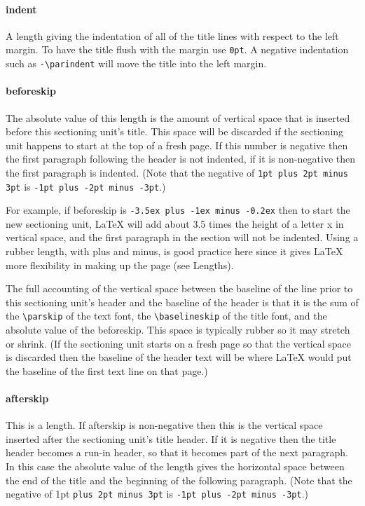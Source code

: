 \paragraph{indent}

A length giving the indentation of all of the title lines with respect to the
left margin. To have the title flush with the margin use \verb|0pt|. A negative
indentation such as \verb|-\parindent| will move the title into the left margin.

\paragraph{beforeskip}

The absolute value of this length is the amount of vertical space that is
inserted before this sectioning unit’s title. This space will be discarded if
the sectioning unit happens to start at the top of a fresh page. If this number
is negative then the first paragraph following the header is not indented, if
it is non-negative then the first paragraph is indented. (Note that the
negative of \verb|1pt plus 2pt minus 3pt| is \verb|-1pt plus -2pt minus -3pt|.)

For example, if beforeskip is \verb|-3.5ex plus -1ex minus -0.2ex| then to start
the new sectioning unit, LaTeX will add about 3.5 times the height of a
letter x in vertical space, and the first paragraph in the section will not
be indented. Using a rubber length, with plus and minus, is good practice
here since it gives LaTeX more flexibility in making up the page (see
Lengths).

The full accounting of the vertical space between the baseline of the line
prior to this sectioning unit’s header and the baseline of the header is
that it is the sum of the \verb|\parskip| of the text font, the \verb|\baselineskip| of
the title font, and the absolute value of the beforeskip. This space is
typically rubber so it may stretch or shrink. (If the sectioning unit
starts on a fresh page so that the vertical space is discarded then the
baseline of the header text will be where LaTeX would put the baseline of
the first text line on that page.)

\paragraph{afterskip}

This is a length. If afterskip is non-negative then this is the vertical space
inserted after the sectioning unit’s title header. If it is negative then the
title header becomes a run-in header, so that it becomes part of the next
paragraph. In this case the absolute value of the length gives the horizontal
space between the end of the title and the beginning of the following
paragraph. (Note that the negative of 1pt \verb|plus 2pt minus 3pt| is
\verb|-1pt plus -2pt minus -3pt|.)

